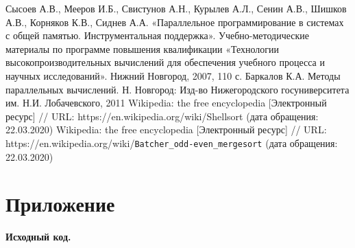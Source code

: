 \documentclass{report}
\begin{document}
\begin{thebibliography}{1}
 Сысоев А.В., Мееров И.Б., Свистунов А.Н., Курылев А.Л., Сенин А.В., Шишков А.В., Корняков К.В., Сиднев А.А. «Параллельное программирование в системах с общей памятью. Инструментальная поддержка». Учебно-методические материалы по программе повышения квалификации «Технологии высокопроизводительных вычислений для обеспечения учебного процесса и научных исследований». Нижний Новгород, 2007, 110 с. 
 Баркалов К.А. Методы параллельных вычислений. Н. Новгород: Изд-во Нижегородского госуниверситета им. Н.И. Лобачевского, 2011
 Wikipedia: the free encyclopedia [Электронный ресурс] // URL: https://en.wikipedia.org/wiki/Shellsort (дата обращения: 22.03.2020)
 Wikipedia: the free encyclopedia [Электронный ресурс] // URL: https://en.wikipedia.org/wiki/\verb|Batcher_odd-even_mergesort| (дата обращения: 22.03.2020)
\end{thebibliography}
\newpage

\section*{Приложение}
\centerline{\bfseries Исходный код.} 
















\end{document}
